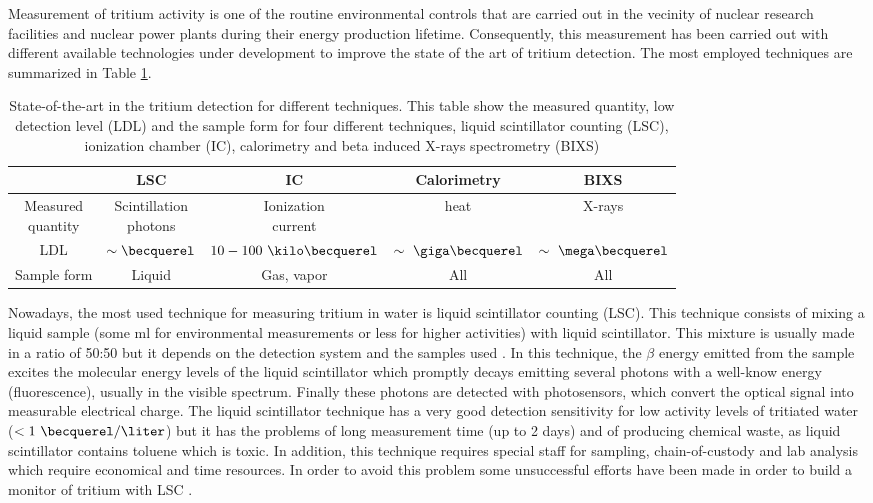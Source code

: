 Measurement of tritium activity is one of the routine environmental controls that are carried out in the vecinity of nuclear research facilities and nuclear power plants during their energy production lifetime. Consequently, this measurement has been carried out with different available technologies under development to improve the state of the art of tritium detection. The most employed techniques are summarized in Table \ref{tab:DifferentThecnics}.

\begin{table}[htbp]
\begin{center}
\begin{tabular}{|c|c|c|c|c|}
\hline
 & LSC & IC & Calorimetry & BIXS\\
\hline \hline \hline
\parbox{5em}{\centering Measured\\ quantity} & \parbox{5em}{\centering Scintillation\\ photons} &  \parbox{5em}{\centering Ionization\\ current} & heat & X-rays\\ \hline
LDL & $\sim\becquerel$ & $10-100~\kilo\becquerel$ & $\sim~\giga\becquerel$ & $\sim~\mega\becquerel$ \\ \hline
Sample form & Liquid & Gas, vapor & All & All \\ \hline
\end{tabular}
\caption{State-of-the-art in the tritium detection for different techniques. This table show the measured quantity, low detection level (LDL) and the sample form for four different techniques, liquid scintillator counting (LSC), ionization chamber (IC), calorimetry and beta induced X-rays spectrometry (BIXS)}
\label{tab:DifferentThecnics}
\end{center}
\end{table}

Nowadays, the most used technique for measuring tritium in water is liquid scintillator counting (LSC). This technique consists of mixing a liquid sample (some ml for environmental measurements or less for higher activities) with liquid scintillator. This mixture is usually made in a ratio of 50:50 but it depends on the detection system and the samples used \cite{LSCothers, HofstetterSeveral}. In this technique, the $\beta$ energy emitted from the sample excites the molecular energy levels of the liquid scintillator which promptly decays emitting several photons with a well-know energy (fluorescence), usually in the visible spectrum. Finally these photons are detected with photosensors, which convert the optical signal into measurable electrical charge. The liquid scintillator technique has a very good detection sensitivity for low activity levels of tritiated water ($<1~\becquerel/\liter$) \cite{0.6Bq_L} but it has the problems of long measurement time (up to 2 days) and of producing chemical waste, as liquid scintillator contains toluene which is toxic. In addition, this technique requires special staff for sampling, chain-of-custody and lab analysis which require economical and time resources. In order to avoid this problem some unsuccessful efforts have been made in order to build a monitor of tritium with LSC \cite{OnlineLSC}. 

